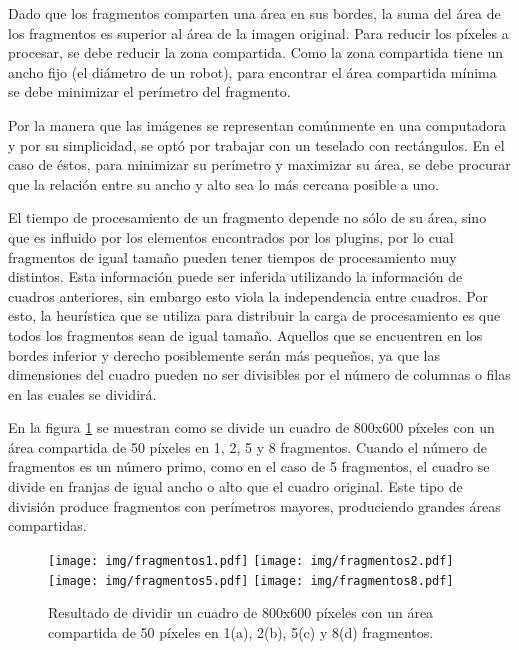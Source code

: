 Dado que los fragmentos comparten una área en sus bordes, la suma del área de
los fragmentos es superior al área de la imagen original. Para reducir los
píxeles a procesar, se debe reducir la zona compartida. Como la zona compartida
tiene un ancho fijo (el diámetro de un robot), para encontrar el área compartida
mínima se debe minimizar el perímetro del fragmento.

Por la manera que las imágenes se representan comúnmente en una computadora y
por su simplicidad, se optó por trabajar con un teselado con rectángulos. En el
caso de éstos, para minimizar su perímetro y maximizar su área, se debe procurar
que la relación entre su ancho y alto sea lo más cercana posible a uno.

El tiempo de procesamiento de un fragmento depende no sólo de su área, sino que
es influido por los elementos encontrados por los plugins, por lo cual
fragmentos de igual tamaño pueden tener tiempos de procesamiento muy distintos.
Esta información puede ser inferida utilizando la información de cuadros
anteriores, sin embargo esto viola la independencia entre cuadros. Por esto, la
heurística que se utiliza para distribuir la carga de procesamiento es que todos
los fragmentos sean de igual tamaño. Aquellos que se encuentren en los bordes
inferior y derecho posiblemente serán más pequeños, ya que las dimensiones del
cuadro pueden no ser divisibles por el número de columnas o filas en las cuales
se dividirá.

En la figura \ref{fragmentos} se muestran como se divide un cuadro de 800x600
píxeles con un área compartida de 50 píxeles en 1, 2, 5 y 8 fragmentos. Cuando
el número de fragmentos es un número primo, como en el caso de 5 fragmentos, el
cuadro se divide en franjas de igual ancho o alto que el cuadro original. Este
tipo de división produce fragmentos con perímetros mayores, produciendo grandes
áreas compartidas.

\begin{figure}[!htb]

	\texttt{[image: img/fragmentos1.pdf]}
	\texttt{[image: img/fragmentos2.pdf]}
	\texttt{[image: img/fragmentos5.pdf]}
	\texttt{[image: img/fragmentos8.pdf]}
	\caption{Resultado de dividir un cuadro de 800x600 píxeles con un área
	compartida de 50 píxeles en 1(a), 2(b), 5(c) y 8(d) fragmentos.}
	\label{fragmentos}

\end{figure}


